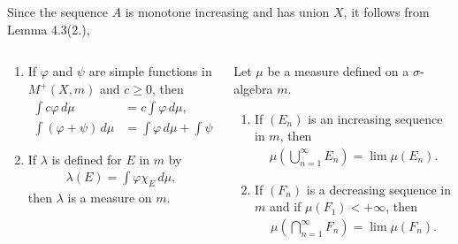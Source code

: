 \documentclass{beamer}
\numberwithin{equation}{section}
\begin{document}
\begin{frame}\frametitle{{\normalsize \secname} \\ {\large \subsecname}}
    Since the sequence $A$ is monotone increasing and has union $X$, it follows from Lemma 4.3(2.),
    \begingroup
    \footnotesize
    \begin{columns}
        \begin{column}{0.48\textwidth}
            \begin{lemma}[4.3]
                \begin{enumerate}
                    \item If $\varphi$ and $\psi$ are simple functions in $M^+(X,m)$ and $c \geq 0$, then
                    \begin{align}
                        \int c \varphi \, d\mu &= c \int \varphi \, d\mu, \\
                        \int \left( \varphi + \psi \right) \, d\mu &= \int \varphi \, d\mu + \int \psi \, d\mu.
                    \end{align}
                    \item If $\lambda$ is defined for $E$ in $m$ by
                    \begin{align}
                        \lambda(E) = \int \varphi \chi_E \, d\mu,
                    \end{align}
                    then $\lambda$ is a measure on $m$.
                \end{enumerate}
            \end{lemma}
        \end{column}
        \begin{column}{0.48\textwidth}
            \begin{lemma}[3.4]
                Let $\mu$ be a measure defined on a $\sigma$-algebra $m$.
                \begin{enumerate}
                    \item If $(E_n)$ is an increasing sequence in $m$, then
                    \begin{align}
                        \mu\left(\bigcup_{n = 1}^\infty E_n\right) = \lim \mu\left(E_n\right).
                    \end{align}
                    \item If $(F_n)$ is a decreasing sequence in $m$ and if $\mu\left(F_1\right) < +\infty$, then
                    \begin{align}
                        \mu\left(\bigcap_{n = 1}^\infty F_n\right) = \lim \mu\left(F_n\right).
                    \end{align}
                \end{enumerate}
            \end{lemma}
        \end{column}
    \end{columns}
    \endgroup
\end{frame}
\end{document}

